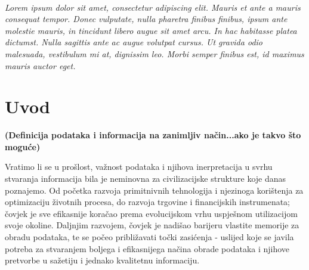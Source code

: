 \documentclass[a4paper,12pt,oneside]{memoir}
\begin{document}
\begin{titlingpage}
            \newpage
                \thispagestyle{empty}
                $ $
                    \vspace{5cm}
                    \textit{
                        \\
                        Lorem ipsum dolor sit amet, consectetur adipiscing elit. Mauris et ante a mauris consequat tempor. Donec vulputate, nulla pharetra finibus finibus, ipsum ante molestie mauris, in tincidunt libero augue sit amet arcu. In hac habitasse platea dictumst. Nulla sagittis ante ac augue volutpat cursus. Ut gravida odio malesuada, vestibulum mi at, dignissim leo. Morbi semper finibus est, id maximus mauris auctor eget.
                    }
    \end{titlingpage}
    \begin{KeepFromToc}
        \tableofcontents
    \end{KeepFromToc}
    \chapter{Uvod}
        \textbf{(Definicija podataka i informacija na zanimljiv način...ako je takvo što moguće)}

        Vratimo li se u prošlost, važnost podataka i njihova inerpretacija u svrhu stvaranja informacija bila je neminovna za civilizacijske strukture koje danas poznajemo. Od početka razvoja primitnivnih tehnologija i njezinoga korištenja za optimizaciju životnih procesa, do razvoja trgovine i financijskih instrumenata; čovjek je sve efikasnije koračao prema evolucijskom vrhu uspješnom utilizacijom svoje okoline. Daljnjim razvojem, čovjek je nadišao barijeru vlastite memorije za obradu podataka, te se počeo približavati točki zasićenja - uslijed koje se javila potreba za stvaranjem boljega i efikasnijega načina obrade podataka i njihove pretvorbe u sažetiju i jednako kvalitetnu informaciju.
\end{document}
